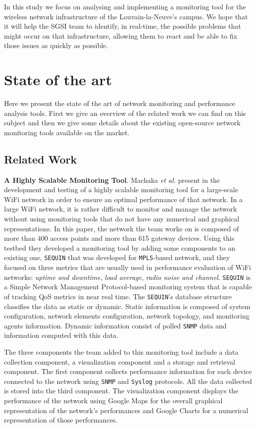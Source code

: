 In this study we focus on analysing and implementing a monitoring tool for the wireless network infrastructure of the Louvain-la-Neuve's campus. We hope that it will help the SGSI team to identify, in real-time, the possible problems that might occur on that infrastructure, allowing them to react and be able to fix those issues as quickly as possible.


\section{State of the art}
Here we present the state of the art of network monitoring and performance analysis tools.
First we give an overview of the related work we can find on this subject and then we give some details about the existing open-source network monitoring tools available on the market.

\subsection{Related Work}

\textbf{A Highly Scalable Monitoring Tool}. Machaka \textit{et al.} present in \cite{article1} the development and testing of a highly scalable monitoring tool for a large-scale WiFi network in order to ensure an optimal performance of that network. In a large WiFi network, it is rather difficult to monitor and manage the network without using monitoring tools that do not have any numerical and graphical representations. In this paper, the network the team works on is composed of more than 400 access points and more than 615 gateway devices. Using this testbed they developed a monitoring tool by adding some components to an existing one, \texttt{SEQUIN} \cite{sequin} that was developed for \texttt{MPLS}-based network, and they focused on three metrics that are usually used in performance evaluation of WiFi networks: \textit{uptime and downtime}, \textit{load average}, \textit{radio noise and channel}. \texttt{SEQUIN} is a Simple Network Management Protocol-based monitoring system that is capable of tracking QoS metrics in near real time. The \texttt{SEQUIN}'s database structure classifies the data as static or dynamic. Static information is composed of system configuration, network elements configuration, network topology, and monitoring agents information. Dynamic information consist of polled \texttt{SNMP} data and information computed with this data. 

The three components the team added to this monitoring tool include a data collection component, a visualization component and a storage and retrieval component. The first component collects performance information for each device connected to the network using \texttt{SNMP} and \texttt{Syslog} protocols. All the data collected is stored into the third component. The visualization component displays the performance of the network using Google Maps for the overall graphical representation of the network's performances and Google Charts for a numerical representation of those performances.

